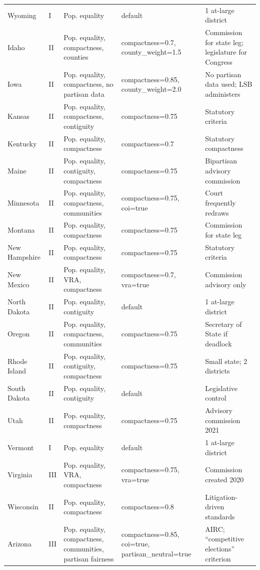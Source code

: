 \begin{landscape}
\begin{longtable}{lllll}
Wyoming & I & Pop. equality & default & 1 at-large district\\
Idaho & II & Pop. equality, compactness, counties & compactness=0.7, county\_weight=1.5 & Commission for state leg; legislature for Congress\\
Iowa & II & Pop. equality, compactness, no partisan data & compactness=0.85, county\_weight=2.0 & No partisan data used; LSB administers\\
Kansas & II & Pop. equality, compactness, contiguity & compactness=0.75 & Statutory criteria\\
Kentucky & II & Pop. equality, compactness & compactness=0.7 & Statutory compactness\\
Maine & II & Pop. equality, contiguity, compactness & compactness=0.75 & Bipartisan advisory commission\\
Minnesota & II & Pop. equality, compactness, communities & compactness=0.75, coi=true & Court frequently redraws\\
Montana & II & Pop. equality, compactness & compactness=0.75 & Commission for state leg\\
New Hampshire & II & Pop. equality, compactness & compactness=0.75 & Statutory criteria\\
New Mexico & II & Pop. equality, VRA, compactness & compactness=0.7, vra=true & Commission advisory only\\
North Dakota & II & Pop. equality, contiguity & default & 1 at-large district\\
Oregon & II & Pop. equality, compactness, communities & compactness=0.75 & Secretary of State if deadlock\\
Rhode Island & II & Pop. equality, contiguity, compactness & compactness=0.75 & Small state; 2 districts\\
South Dakota & II & Pop. equality, contiguity & default & Legislative control\\
Utah & II & Pop. equality, compactness & compactness=0.75 & Advisory commission 2021\\
Vermont & I & Pop. equality & default & 1 at-large district\\
Virginia & III & Pop. equality, VRA, compactness & compactness=0.75, vra=true & Commission created 2020\\
Wisconsin & II & Pop. equality, compactness & compactness=0.8 & Litigation-driven standards\\
Arizona & III & Pop. equality, compactness, communities, partisan fairness & compactness=0.85, coi=true, partisan\_neutral=true & AIRC; ``competitive elections'' criterion\\

\end{longtable}
\end{landscape}
